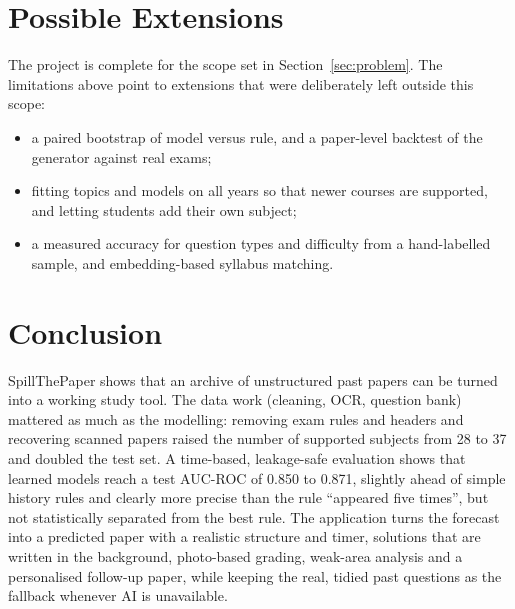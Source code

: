 \documentclass[11pt,a4paper]{article}
\begin{document}
\section{Possible Extensions}
\label{sec:future}
The project is complete for the scope set in Section~\ref{sec:problem}. The limitations above point to extensions that were
deliberately left outside this scope:
\begin{itemize}
\item a paired bootstrap of model versus rule, and a paper-level backtest of the generator against real exams;
\item fitting topics and models on all years so that newer courses are supported, and letting students add their own subject;
\item a measured accuracy for question types and difficulty from a hand-labelled sample, and embedding-based syllabus matching.
\end{itemize}

\section{Conclusion}
\label{sec:concl}
SpillThePaper shows that an archive of unstructured past papers can be turned into a working study tool. The data work
(cleaning, OCR, question bank) mattered as much as the modelling: removing exam rules and headers and recovering scanned papers
raised the number of supported subjects from 28 to 37 and doubled the test set. A time-based, leakage-safe evaluation shows
that learned models reach a test AUC-ROC of 0.850 to 0.871, slightly ahead of simple history rules and clearly more precise than
the rule ``appeared five times'', but not statistically separated from the best rule. The application turns the forecast into a
predicted paper with a realistic structure and timer, solutions that are written in the background, photo-based grading,
weak-area analysis and a personalised follow-up paper, while keeping the real, tidied past questions as the fallback whenever
AI is unavailable.

\end{document}
